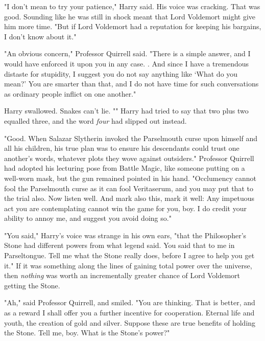 "I don't mean to try your patience," Harry said. His voice was cracking. That 
was good. Sounding like he was still in shock meant that Lord Voldemort might 
give him more time. "But if Lord Voldemort had a reputation for keeping his 
bargains, I don't know about it."

"An obvious concern," Professor Quirrell said. "There is a simple answer, and I 
would have enforced it upon you in any case. . And 
since I have a tremendous distaste for stupidity, I suggest you do not say 
anything like `What do you mean?' You are smarter than that, and I do not have 
time for such conversations as ordinary people inflict on one another."

Harry swallowed. Snakes can't lie. "" Harry 
had tried to say that two plus two equalled three, and the word \emph{four} had 
slipped out instead.

"Good. When Salazar Slytherin invoked the Parselmouth curse upon himself and 
all his children, his true plan was to ensure his descendants could trust one 
another's words, whatever plots they wove against outsiders." Professor 
Quirrell had adopted his lecturing pose from Battle Magic, like someone putting 
on a well-worn mask, but the gun remained pointed in his hand. "Occlumency 
cannot fool the Parselmouth curse as it can fool Veritaserum, and you may put 
that to the trial also. Now listen well.  And mark also this, mark it well:  Any impetuous act you are 
contemplating cannot win the game for you, boy. I do credit your ability to 
annoy me, and suggest you avoid doing so."

"You said," Harry's voice was strange in his own ears, "that the Philosopher's 
Stone had different powers from what legend said. You said that to me in 
Parseltongue. Tell me what the Stone really does, before I agree to help you 
get it." If it was something along the lines of gaining total power over the 
universe, then \emph{nothing} was worth an incrementally greater chance of Lord 
Voldemort getting the Stone.

"Ah," said Professor Quirrell, and smiled. "You are thinking. That is better, 
and as a reward I shall offer you a further incentive for cooperation. Eternal 
life and youth, the creation of gold and silver. Suppose these are true 
benefits of holding the Stone. Tell me, boy. What is the Stone's power?"


